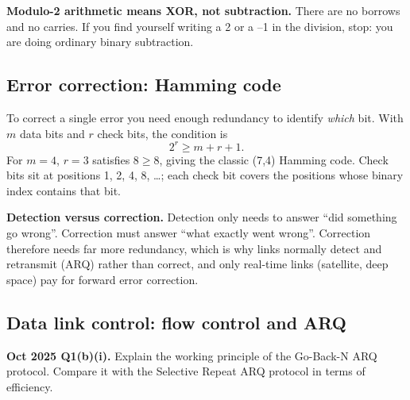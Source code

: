 \documentclass[11pt,a4paper]{article}
\begin{document}
\begin{dangerbox}
\textbf{Modulo-2 arithmetic means XOR, not subtraction.} There are no borrows and no carries. If you find yourself writing a 2 or a --1 in the division, stop: you are doing ordinary binary subtraction.
\end{dangerbox}

\subsection{Error correction: Hamming code}

To correct a single error you need enough redundancy to identify \emph{which} bit. With $m$ data bits and $r$ check bits, the condition is
\[
2^r \ge m + r + 1.
\]
For $m = 4$, $r = 3$ satisfies $8 \ge 8$, giving the classic (7,4) Hamming code. Check bits sit at positions 1, 2, 4, 8, \dots; each check bit covers the positions whose binary index contains that bit.

\begin{rememberbox}
\textbf{Detection versus correction.} Detection only needs to answer ``did something go wrong''. Correction must answer ``what exactly went wrong''. Correction therefore needs far more redundancy, which is why links normally detect and retransmit (ARQ) rather than correct, and only real-time links (satellite, deep space) pay for forward error correction.
\end{rememberbox}

\subsection{Data link control: flow control and ARQ}

\begin{pyqbox}
\textbf{Oct 2025 Q1(b)(i).} Explain the working principle of the Go-Back-N ARQ protocol. Compare it with the Selective Repeat ARQ protocol in terms of efficiency.
\end{pyqbox}
\end{document}
